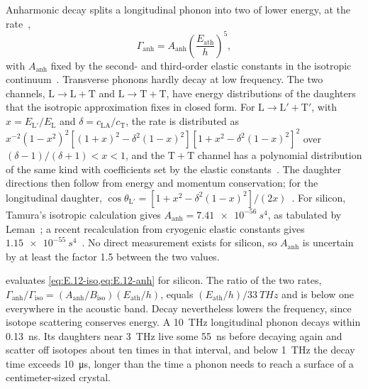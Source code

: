 Anharmonic decay splits a longitudinal phonon into two of lower energy, at the rate~\cite{tamura1985spontaneous}, \cite[Eq.~(8)]{leman2012invited}
\begin{equation}
  \varGamma_{\mathrm{anh}} = A_{\mathrm{anh}}\left(\frac{E_{\mathrm{ath}}}{h}\right)^5 ,
  \label{eq:E.12-anh}
\end{equation}
with $A_{\mathrm{anh}}$ fixed by the second- and third-order elastic constants in the isotropic continuum~\cite[Eq.~(8)]{leman2012invited}. Transverse phonons hardly decay at low frequency. The two channels, $\mathrm{L}\to\mathrm{L}+\mathrm{T}$ and $\mathrm{L}\to\mathrm{T}+\mathrm{T}$, have energy distributions of the daughters that the isotropic approximation fixes in closed form. For $\mathrm{L}\to\mathrm{L}'+\mathrm{T}'$, with $x = E_{\mathrm{L}'}/E_{\mathrm{L}}$ and $\delta = c_{\mathrm{LA}}/c_{\mathrm{T}}$, the rate is distributed as $x^{-2}(1 - x^2)^2[(1 + x)^2 - \delta^2(1 - x)^2][1 + x^2 - \delta^2(1 - x)^2]^2$ over $(\delta - 1)/(\delta + 1) < x < 1$, and the $\mathrm{T}+\mathrm{T}$ channel has a polynomial distribution of the same kind with coefficients set by the elastic constants~\cite[Eqs.~(9) and~(12)]{leman2012invited}. The daughter directions then follow from energy and momentum conservation; for the longitudinal daughter, $\cos\theta_{\mathrm{L}'} = [1 + x^2 - \delta^2(1 - x)^2]/(2x)$~\cite[Eq.~(10)]{leman2012invited}. For silicon, Tamura's isotropic calculation gives $A_{\mathrm{anh}} = \SI{7.41e-56}{s^4}$, as tabulated by Leman~\cite[Table~I]{leman2012invited}; a recent recalculation from cryogenic elastic constants gives $\SI{1.15e-55}{s^4}$~\cite[Table~3]{hernandez2025modeling}. No direct measurement exists for silicon, so $A_{\mathrm{anh}}$ is uncertain by at least the factor 1.5 between the two values.

 evaluates \cref{eq:E.12-iso,eq:E.12-anh} for silicon. The ratio of the two rates, $\varGamma_{\mathrm{anh}}/\varGamma_{\mathrm{iso}} = (A_{\mathrm{anh}}/B_{\mathrm{iso}})(E_{\mathrm{ath}}/h)$, equals $(E_{\mathrm{ath}}/h)/\SI{33}{THz}$ and is below one everywhere in the acoustic band. Decay nevertheless lowers the frequency, since isotope scattering conserves energy. A \SI{10}{THz} longitudinal phonon decays within \SI{0.13}{ns}. Its daughters near \SI{3}{THz} live some \SI{55}{ns} before decaying again and scatter off isotopes about ten times in that interval, and below \SI{1}{THz} the decay time exceeds \SI{10}{\micro s}, longer than the time a phonon needs to reach a surface of a centimeter-sized crystal.

